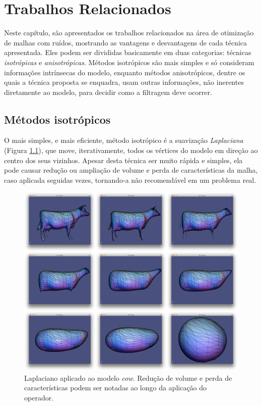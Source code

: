 \chapter{Trabalhos Relacionados}
\label{cap:trabalhos-relacionados}

Neste capítulo, são apresentados os trabalhos relacionados na área de otimização de malhas com ruídos, mostrando as vantagens e desvantagens de cada técnica apresentada. Eles podem ser divididas basicamente em duas categorias: técnicas \textit{isotrópicas} e \textit{anisotrópicas}. Métodos isotrópicos são mais simples e só consideram informações intrínsecas do modelo, enquanto métodos anisotrópicos, dentre os quais a técnica proposta se enquadra, usam outras informações, não inerentes diretamente ao modelo, para decidir como a filtragem deve ocorrer.

\section{Métodos isotrópicos}
O mais simples, e mais eficiente, método isotrópico é a suavização \textit{Laplaciana} (Figura \ref{fig:laplacian}), que move, iterativamente, todos os vértices do modelo em direção ao centro dos seus vizinhos. Apesar desta técnica ser muito rápida e simples, ela pode causar redução ou ampliação de volume e perda de características da malha, caso aplicada seguidas vezes, tornando-a não recomendável em um problema real.

\begin{figure}[!h]
\captionsetup{width=\linewidth}
\centering
\includegraphics[scale=0.17]{figuras/laplacian.jpg}
\caption{Laplaciano aplicado ao modelo \textit{cow}. Redução de volume e perda de características podem ser notadas ao longo da aplicação do operador.}
\label{fig:laplacian}
\end{figure}


